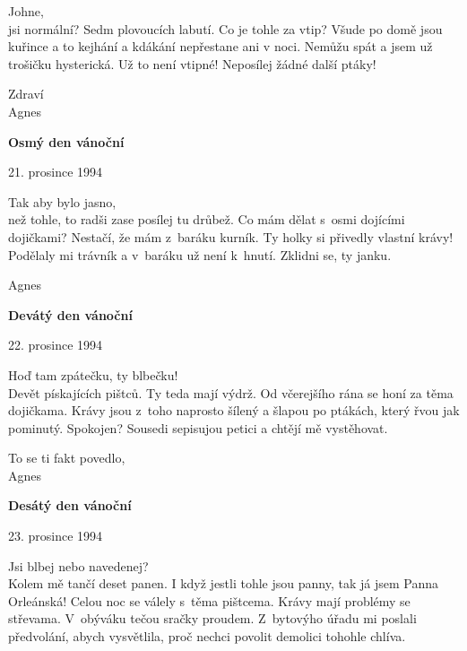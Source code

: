 \noindent
Johne, \\
jsi normální? Sedm plovoucích labutí. Co je tohle za vtip? Všude po domě jsou kuřince a to kejhání a kdákání nepřestane ani v noci. Nemůžu spát a jsem už trošičku hysterická. Už to není vtipné! Neposílej žádné další ptáky! 

\medskip

\noindent
Zdraví \\
Agnes

\bigskip

\noindent
\textbf{Osmý den vánoční}

\begin{flushright}
21. prosince 1994 
\end{flushright}

\noindent
Tak aby bylo jasno, \\
než tohle, to radši zase posílej tu drůbež. Co mám dělat s osmi dojícími dojičkami? Nestačí, že mám z baráku kurník. Ty holky si přivedly vlastní krávy! Podělaly mi trávník a v baráku už není k hnutí. Zklidni se, ty janku.

\medskip

\noindent
Agnes 

\bigskip

\noindent
\textbf{Devátý den vánoční}

\begin{flushright}
22. prosince 1994 
\end{flushright}

\noindent
Hoď tam zpátečku, ty blbečku! \\
Devět pískajících pištců. Ty teda mají výdrž. Od včerejšího rána se honí za těma dojičkama. Krávy jsou z toho naprosto šílený a šlapou po ptákách, který řvou jak pominutý. Spokojen? Sousedi sepisujou petici a chtějí mě vystěhovat. 

\medskip

\noindent
To se ti fakt povedlo, \\
Agnes

\bigskip

\noindent
\textbf{Desátý den vánoční}

\begin{flushright}
23. prosince 1994 
\end{flushright}

 \noindent
Jsi blbej nebo navedenej? \\
Kolem mě tančí deset panen. I když jestli tohle jsou panny, tak já jsem Panna Orleánská! Celou noc se válely s těma pištcema. Krávy mají problémy se střevama. V obýváku tečou sračky proudem. Z bytovýho úřadu mi poslali předvolání, abych vysvětlila, proč nechci povolit demolici tohohle chlíva.  

